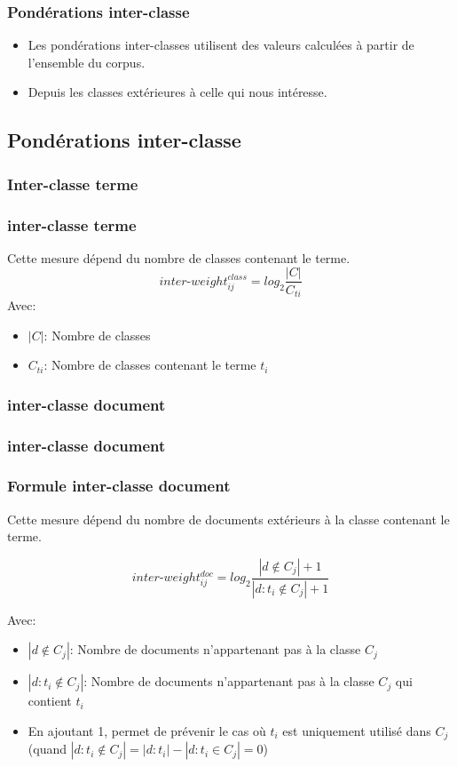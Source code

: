 \documentclass[12pt]{beamer}
\begin{document}
\begin{frame}
\frametitle{Pondérations inter-classe}
\begin{itemize}
\item Les pondérations inter-classes utilisent des valeurs calculées à partir de l'ensemble du corpus.

\item Depuis les classes extérieures à celle qui nous intéresse.
\end{itemize}
\end{frame}

\begin{frame}
\subsection{Pondérations inter-classe}
\frametitle{Inter-classe terme}
\subsubsection*{inter-classe terme}

Cette mesure dépend du nombre de classes contenant le terme.
\[inter\mbox{-}weight_{ij}^{class} = log_2 \frac{|C|}{C_{ti}}\]
Avec:
\begin{itemize}
	\item $|C|$: Nombre de classes			
	\item $C_{ti}$: Nombre de classes contenant le terme $t_i$
  \end{itemize}
\end{frame}
\subsubsection*{inter-classe document}

\begin{frame}
\subsubsection*{inter-classe document}
\frametitle{Formule inter-classe document}
Cette mesure dépend du nombre de documents extérieurs à la classe contenant le terme.
 \begin{small}
 

\[ inter\mbox{-}weight_{ij}^{doc} = log_2 \frac{|d \notin{C_j}|+1}{|d:t_i \notin{C_j}|+1}\]
 \end{small}
 Avec:
 \begin{small}
\begin{itemize}
	\item $|d \notin  {C_j}|$: Nombre de documents n'appartenant pas à la classe $C_j$
	\item $|d:t_i \notin {C_j}|$: Nombre de documents n'appartenant pas à la classe $C_j$ qui contient $t_i$ 
	\item En ajoutant 1, permet de prévenir le cas où $t_i$ est uniquement utilisé dans $C_j$ (quand $|d:t_i \notin{C_j}|={|d:t_i|-|d:t_i \in{C_j}|} = 0$)
  \end{itemize}
 \end{small}
\end{frame}  
\end{document}
